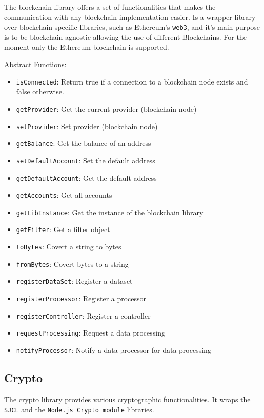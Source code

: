 The blockchain library offers a set of functionalities that makes the communication with any blockchain implementation easier. Is a wrapper library over blockchain specific libraries, such as Ethereum's \verb|web3|, and it's main purpose is to be blockchain agnostic allowing the use of different Blockchains. For the moment only the Ethereum blockchain is supported.

Abstract Functions:

\begin{itemize}
  \item \verb|isConnected|: Return true if a connection to a blockchain node exists and false otherwise.
  \item \verb|getProvider|: Get the current provider (blockchain node)
  \item \verb|setProvider|: Set provider (blockchain node)
  \item \verb|getBalance|: Get the balance of an address
  \item \verb|setDefaultAccount|: Set the default address
  \item \verb|getDefaultAccount|: Get the default address
  \item \verb|getAccounts|: Get all accounts
  \item \verb|getLibInstance|: Get the instance of the blockchain library
  \item \verb|getFilter|: Get a filter object
  \item \verb|toBytes|: Covert a string to bytes
  \item \verb|fromBytes|: Covert bytes to a string
  \item \verb|registerDataSet|: Register a dataset
  \item \verb|registerProcessor|: Register a processor
  \item \verb|registerController|: Register a controller
  \item \verb|requestProcessing|: Request a data processing
  \item \verb|notifyProcessor|: Notify a data processor for data processing
\end{itemize}

\subsection{Crypto}
\label{implemenation:libs:cr}

The crypto library provides various cryptographic functionalities. It wraps the \verb|SJCL| and the \verb|Node.js Crypto module| libraries.

